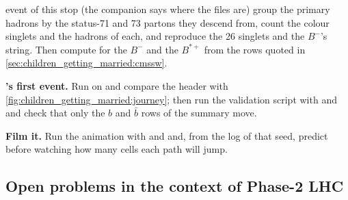 \begin{exercises}
  \CMSSW event of this stop (the companion says where the files are)
  group the primary hadrons by the status-71 and 73 partons they descend
  from, count the colour singlets and the hadrons of each, and reproduce
  the 26 singlets and the $B^-$'s string. Then compute \xE for the $B^-$ and the $B^{*+}$
  from the rows quoted in \cref{sec:children_getting_married:cmssw}.
\item \textbf{\PYTHIA's first event.} Run  on
   and compare
  the header with \cref{fig:children_getting_married:journey}; then run
  the validation script with  and  and
  check that only the $b$ and $\bar b$ rows of the summary move.
\item \textbf{Film it.} Run the animation with  and
   and, from the  log of that seed, predict before
  watching how many cells each path will jump.
\end{exercises}

\subsection*{Open problems in the context of Phase-2 LHC}
\label{sec:children_getting_married:open_problems}

